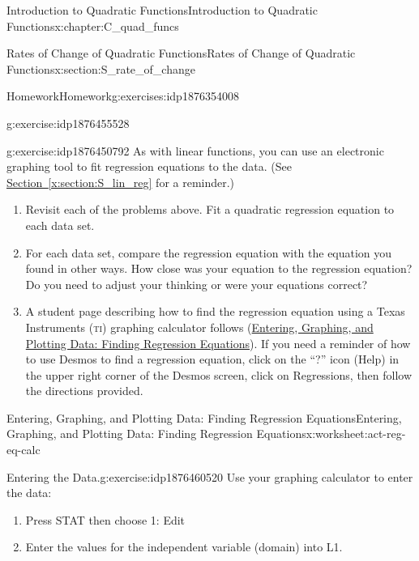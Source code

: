 \documentclass[oneside,10pt,]{book}
\newcommand{\xreffont}{\relax}
\newcommand{\initialism}[1]{\textsc{\MakeLowercase{#1}}}
\numberwithin{equation}{chapter}
\begin{document}
\begin{chapterptx}{Introduction to Quadratic Functions}{}{Introduction to Quadratic Functions}{}{}{x:chapter:C_quad_funcs}
\begin{sectionptx}{Rates of Change of Quadratic Functions}{}{Rates of Change of Quadratic Functions}{}{}{x:section:S_rate_of_change}
\begin{exercises-subsection}{Homework}{}{Homework}{}{}{g:exercises:idp1876354008}
\begin{divisionexercise}{5}{}{}{g:exercise:idp1876455528}
\begin{enumerate}[font=\bfseries,label=(\alph*),ref=\alph*]
\end{enumerate}
\end{divisionexercise}%
\begin{divisionexercise}{6}{}{}{g:exercise:idp1876450792}%
As with linear functions, you can use an electronic graphing tool to fit regression equations to the data. (See \hyperref[x:section:S_lin_reg]{Section~{\xreffont\ref{x:section:S_lin_reg}}} for a reminder.)%
\begin{enumerate}[font=\bfseries,label=(\alph*),ref=\alph*]
\item{}Revisit each of the problems above. Fit a quadratic regression equation to each data set.%
\item{}For each data set, compare the regression equation with the equation you found in other ways. How close was your equation to the regression equation? Do you need to adjust your thinking or were your equations correct?%
\item{}A student page describing how to find the regression equation using a Texas Instruments (\initialism{TI}) graphing calculator follows (\hyperref[x:worksheet:act-reg-eq-calc]{Entering, Graphing, and Plotting Data: Finding Regression Equations}). If you need a reminder of how to use Desmos to find a regression equation, click on the ``?'' icon (Help) in the upper right corner of the Desmos screen, click on Regressions, then follow the directions provided.%
\end{enumerate}
\end{divisionexercise}%
\end{exercises-subsection}
%
%
\typeout{************************************************}
\typeout{************************************************}
%
\begin{worksheet-subsection}{Entering, Graphing, and Plotting Data: Finding Regression Equations}{}{Entering, Graphing, and Plotting Data: Finding Regression Equations}{}{}{x:worksheet:act-reg-eq-calc}
\begin{divisionexercise}{1}{Entering the Data.}{}{g:exercise:idp1876460520}%
Use your graphing calculator to enter the data:%
\begin{enumerate}[font=\bfseries,label=(\alph*),ref=\alph*]
\item{}Press STAT then choose 1: Edit\textellipsis{}%
\item{}Enter the values for the independent variable (domain) into L1.%

\end{enumerate}
\end{divisionexercise}
\end{worksheet-subsection}
\end{sectionptx}
\end{chapterptx}
\end{document}
